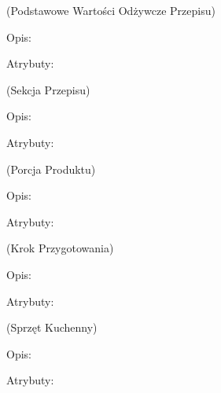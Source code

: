 \begin{enumerate}[label={\textbf{KAT/\protect\threedigits{\theenumi}}}, wide, labelwidth=!, labelindent=0pt, labelsep=0pt, series=reqs]
     \label{kat:RecipeBasicNutritionData} (Podstawowe Wartości Odżywcze Przepisu)

    Opis: \lipsum[1]
    \par
    Atrybuty:
    \begin{itemize}[series=atr]
         \label{kat:RecipeBasicNutritionData:id}
         \label{kat:RecipeBasicNutritionData:energy}
         \label{kat:RecipeBasicNutritionData:protein}
         \label{kat:RecipeBasicNutritionData:fat}
         \label{kat:RecipeBasicNutritionData:carbohydrates}
    \end{itemize}

     \label{kat:RecipeSection} (Sekcja Przepisu)

    Opis: \lipsum[1]
    \par
    Atrybuty:
    \begin{itemize}[series=atr]
         \label{kat:RecipeSection:id}
         \label{kat:RecipeSection:sectionName}
    \end{itemize}

     \label{kat:ProductPortion} (Porcja Produktu)

    Opis: \lipsum[1]
    \par
    Atrybuty:
    \begin{itemize}[series=atr]
         \label{kat:ProductPortion:id}
         \label{kat:ProductPortion:amount}
    \end{itemize}

     \label{kat:PreparationStep} (Krok Przygotowania)

    Opis: \lipsum[1]
    \par
    Atrybuty:
    \begin{itemize}[series=atr]
         \label{kat:PreparationStep:id}
         \label{kat:PreparationStep:ordinalNumber}
         \label{kat:PreparationStep:stepDescription}
    \end{itemize}

     \label{kat:KitchenAppliance} (Sprzęt Kuchenny)

    Opis: \lipsum[1]
    \par
    Atrybuty:
    \begin{itemize}[series=atr]
         \label{kat:KitchenAppliance:id}
         \label{kat:KitchenAppliance:name}
    \end{itemize}


\end{enumerate}
